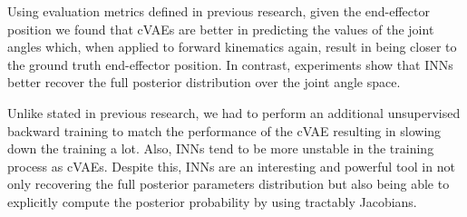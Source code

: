 \documentclass[conference]{IEEEtran}
\begin{document}
Using evaluation metrics defined in previous research, given the end-effector position we found that cVAEs are better in predicting the values of the joint angles which, when applied to forward kinematics again, result in being closer to the ground truth end-effector position. In contrast, experiments show that INNs better recover the full posterior distribution over the joint angle space. 

Unlike stated in previous research, we had to perform an additional unsupervised backward training to match the performance of the cVAE resulting in slowing down the training a lot. Also, INNs tend to be more unstable in the training process as cVAEs. Despite this, INNs are an interesting and powerful tool in not only recovering the full posterior parameters distribution but also being able to explicitly compute the posterior probability by using tractably Jacobians.

\nocite{*}


\end{document}

